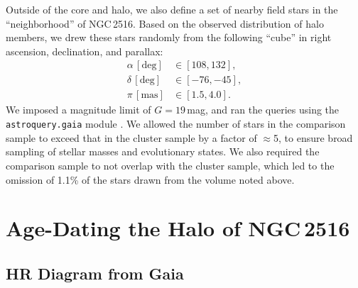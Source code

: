 \documentclass[12pt,twocolumn,tighten]{aastex63}
\newcommand{\cn}{NGC\,2516} %
\begin{document}
Outside of the core and halo, we also define a set of nearby field
stars in the ``neighborhood'' of \cn.  Based on the observed
distribution of halo members, we drew these stars randomly from the
following ``cube'' in right ascension, declination, and parallax:
\begin{align}
  \alpha\,[\mathrm{deg}] &\in [108, 132], \\
  \delta\,[\mathrm{deg}] &\in [-76, -45], \\
  \pi\,[\mathrm{mas}] &\in [1.5, 4.0].
\end{align}
We imposed a magnitude limit of $G=19$\,mag, and ran the queries using
the \texttt{astroquery.gaia} module \citep{astroquery_2018}.  We
allowed the number of stars in the comparison sample to exceed that in
the cluster sample by a factor of $\approx$5, to ensure broad sampling
of stellar masses and evolutionary states.  We also required the
comparison sample to not overlap with the cluster sample, which led to
the omission of 1.1\% of the stars drawn from the volume noted above.


\section{Age-Dating the Halo of NGC\,2516}
\label{sec:agedate}

\subsection{HR Diagram from Gaia}
\label{subsec:hr}
\end{document}
